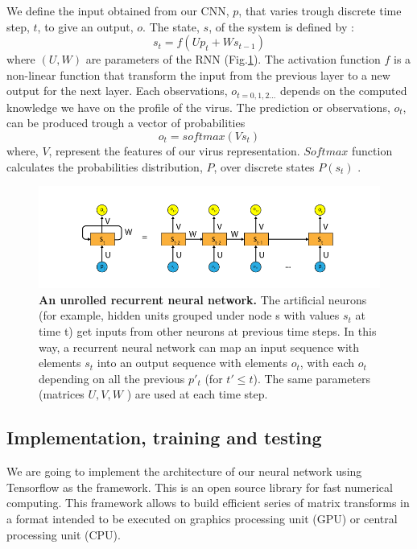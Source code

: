 \documentclass[12pt]{article}
\begin{document}
We define the input obtained from our CNN, $p$, that varies trough discrete time step, $t$, to give an output, $o$. The state, $s$, of the system is defined by :
$$s_t = f(Up_t+ Ws_{t-1})$$ where $(U,W)$ are parameters of the RNN (Fig.\ref{fig:RNN}). The activation function $f$ is a non-linear function that transform the input from the previous layer to a new output for the next layer. Each observations, $o_{t=0,1,2 ... }$ depends on the computed knowledge we have on the profile of the virus. The prediction or observations, $o_t$, can be produced trough a vector of probabilities  $$o_t=softmax(Vs_t)$$ where, $V$, represent the features of our virus representation. $Softmax$ function calculates the probabilities distribution, $P$, over discrete states $P(s_t)$ .

\begin{figure}[h]
    \centering
    \includegraphics[width=\textwidth]{figure-3.png}
    \caption{ \textbf{An unrolled recurrent neural network.} The artificial neurons (for example, hidden units grouped under node s with values $s_t$ at time t) get inputs from other neurons at previous time steps. In this way, a recurrent neural network can map an input sequence with elements $s_t$ into an output sequence with elements $o_t$, with each $o_t$ depending on all the previous $p'_t$ (for $t'\leq t$). The same parameters (matrices $U,V,W$ ) are used at each time step. }
    \label{fig:RNN}
\end{figure}

\subsection{Implementation, training and testing}

We are going to implement the architecture of our neural network using Tensorflow\autocite{abadi2016} as the framework. This is an open source library for fast numerical computing. This framework allows to build efficient series of matrix transforms in a format intended to be executed on graphics processing unit (GPU) or central processing unit (CPU). 
\end{document}
